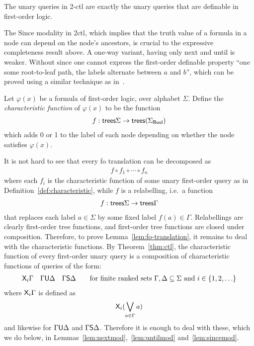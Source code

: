 \begin{theorem} \label{thm:ctl} The unary queries in 2-ctl are exactly the unary queries that are definable in first-order logic.
\end{theorem}

The Since modality in 2ctl, which implies that the truth value of a formula in a node can depend on the node's ancestors, is crucial to the  expressive completeness result above. A one-way variant, having only next and until is weaker. Without since one cannot express the first-order definable property ``one some root-to-leaf path, the labels alternate between $a$ and $b$'', which can be proved using a similar technique as in~\cite[Theorem 1]{bojanczyk2008common}. 
\begin{definition}\label{def:characteristic}
    Let $\varphi(x)$ be a formula of first-order logic, over alphabet $\Sigma$. Define the \emph{characteristic function} of $\varphi(x)$ to be the function
            \begin{align*}
                f : \mathsf {trees} \Sigma \to \mathsf {trees} (\Sigma_{\sf{Bool}})
            \end{align*}
            which adds 0 or 1 to  the label of each node depending on whether the node satisfies $\varphi(x)$.
\end{definition}


It is not hard to see that every fo translation can be decomposed as 
    \begin{align*}
        f \circ f_1 \circ \cdots \circ f_n
    \end{align*}
    where each $f_i$ is the characteristic function of some unary first-order query as in Definition~\ref{def:characteristic}, while $f$ is a relabelling, i.e.~a function
    \begin{align*}
        f : \mathsf {trees} \Sigma \to \mathsf {trees} \Gamma
    \end{align*}
    that replaces each label $a \in \Sigma$ by some fixed label  $f(a) \in \Gamma$. Relabellings are clearly first-order tree functions, and first-order tree functions are closed under composition. Therefore, to prove Lemma~\ref{lem:fo-translation}, it remains to deal with the characteristic functions. By Theorem~\ref{thm:ctl}, the characteristic function of every first-order unary query is a composition of characteristic functions of queries of the form:
    \begin{align*}
        \mathsf X_i \Gamma \quad \Gamma \mathsf U \Delta \quad \Gamma \mathsf S \Delta \qquad \text{for finite ranked sets $\Gamma,\Delta \subseteq \Sigma$ and $i \in \{1,2,\ldots\}$} 
    \end{align*}
    where $\mathsf X_i \Gamma$ is defined as 
    \begin{align*}
        \mathsf X_i (\bigvee_{a \in \Gamma} a) 
    \end{align*}
    and likewise for $\Gamma \mathsf U \Delta $ and $ \Gamma \mathsf S \Delta$. Therefore it is enough to  deal with these, which we do below, in Lemmas~\ref{lem:nextmod},~\ref{lem:untilmod} and~\ref{lem:sincemod}.




